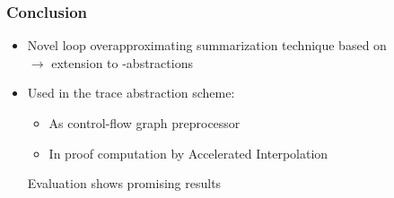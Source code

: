 \begin{frame}[t]
	\frametitle{Conclusion}
	\begin{center}
		\begin{itemize}
			\item Novel loop overapproximating summarization technique based on \qvasr \\
			\onslide<+->$\rightarrow$ extension to \qvasr-abstractions \vspace*{1cm}
			\onslide<+-> \item Used in the trace abstraction scheme:
				\begin{itemize}
				\onslide<+->	\item As control-flow graph preprocessor
				\onslide<+->	\item In proof computation by Accelerated Interpolation
				\end{itemize} \vspace*{1cm}
			\onslide<+->Evaluation shows promising results
		\end{itemize}
	\end{center}
\end{frame}